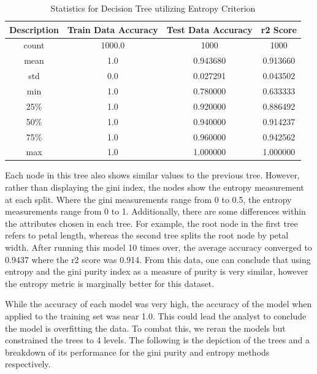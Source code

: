 \documentclass[journal]{IEEEtran}
\begin{document}
\begin{table}[h!]
\centering
\begin{tabular}{ c | c c c }
    Description & Train Data Accuracy & Test Data Accuracy & r2 Score \\ 
\hline
count &              1000.0  &       1000 & 1000\\
mean  &                 1.0  &          0.943680 &    0.913660\\
std   &                 0.0  &          0.027291 &    0.043502\\
min   &                 1.0  &          0.780000 &    0.633333\\
25\%   &                 1.0  &          0.920000 &    0.886492\\
50\%   &                 1.0  &          0.940000 &    0.914237\\
75\%   &                 1.0  &          0.960000 &    0.942562\\
max   &                 1.0  &          1.000000 &    1.000000
\end{tabular}
\caption{Statistics for Decision Tree utilizing Entropy Criterion}
\end{table}

Each node in this tree also shows similar values to the previous tree. However, rather than displaying the gini index, the nodes show the entropy measurement at each split. Where the gini measurements range from 0 to 0.5, the entropy measurements range from 0 to 1. Additionally, there are some differences within the attributes chosen in each tree. For example, the root node in the first tree refers to petal length, whereas the second tree splits the root node by petal width. After running this model 10 times over, the average accuracy converged to 0.9437 where the r2 score was 0.914. From this data, one can conclude that using entropy and the gini purity index as a measure of purity is very similar, however the entropy metric is marginally better for this dataset. 

While the accuracy of each model was very high, the accuracy of the model when applied to the training set was near 1.0. This could lead the analyst to conclude the model is overfitting the data. To combat this, we reran the models but constrained the trees to 4 levels. The following is the depiction of the trees and a breakdown of its performance for the gini purity and entropy methods respectively. 
\end{document}
